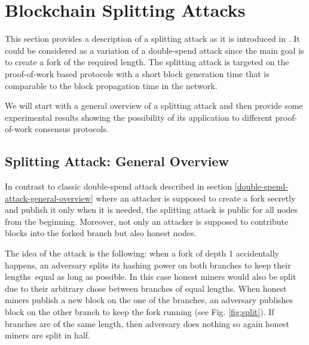 \documentclass[10pt,a4paper]{article}
\numberwithin{equation}{section} %
\theoremstyle{plain}
\theoremstyle{definition}
\theoremstyle{remark}
\begin{document}
	\section{Blockchain Splitting Attacks}
	
	This section provides a description of a splitting attack as it is introduced in \cite{KP15}. It could be considered as a variation of a double-spend attack since the main goal is to create a fork of the required length. The splitting attack is targeted on the proof-of-work based protocols with a short block generation time that is comparable to the block propagation time in the network.
	
	We will start with a general overview of a splitting attack and then provide some experimental results showing the possibility of its application to different proof-of-work consensus protocols.  
	
	\subsection{Splitting Attack: General Overview}
	
	In contrast to classic double-spend attack described in section \ref{double-spend-attack-general-overview} where an attacker is supposed to create a fork secretly and publish it only when it is needed, the splitting attack is public for all nodes from the beginning. Moreover, not only an attacker is supposed to contribute blocks into the forked branch but also honest nodes.
	
	The idea of the attack is the following: when a fork of depth 1 accidentally happens, an adversary splits its hashing power on both branches to keep their lengths\footnotemark \ equal as long as possible. In this case honest miners would also be split due to their arbitrary chose between branches of equal lengths. When honest miners publish a new block on the one of the branches, an adversary publishes block on the other branch to keep the fork running (see Fig. \ref{fig:split}). If branches are of the same length, then adversary does nothing so again honest miners are split in half.
	
	
\end{document}
